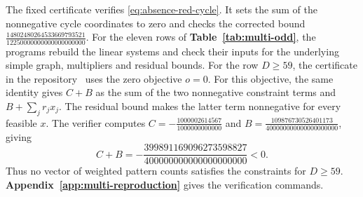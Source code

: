 \documentclass[preprint,11pt,numbers]{elsarticle-arxiv}
\numberwithin{equation}{section}
\theoremstyle{definition}
\begin{document}
The fixed certificate  verifies
\eqref{eq:absence-red-cycle}. It sets the sum of the nonnegative
cycle coordinates to zero and checks the corrected bound
$\frac{14802480264533669793521}{12250000000000000000000}$.
For the eleven rows of \textbf{Table~\ref{tab:multi-odd}}, the programs
rebuild the linear systems and check their inputs for the underlying simple graph,
multipliers and residual bounds. For the row $D\geq59$, the
certificate  in the
repository~\cite{FGSTCode} uses the zero objective $o=0$.
For this objective, the same identity gives $C+B$ as the sum of
the two nonnegative constraint terms and $B+\sum_jr_jx_j$.
The residual bound makes the latter term nonnegative for every
feasible $x$. The verifier computes
$C=-\frac{1000002614567}{1000000000000}$ and
$B=\frac{109876730526401173}{400000000000000000000}$, giving
\begin{equation}\label{eq:odd-final-infeasibility}
 C+B=-\frac{399891169096273598827}{400000000000000000000}<0.
\end{equation}
Thus no vector of weighted pattern counts satisfies the constraints
for $D\geq59$. \textbf{Appendix~\ref{app:multi-reproduction}}
gives the verification commands.
\relax\space%
\relax\space%
\begingroup
\small
\setlength{\bibsep}{3pt plus .3pt minus .3pt}
{}

\endgroup
\end{document}
